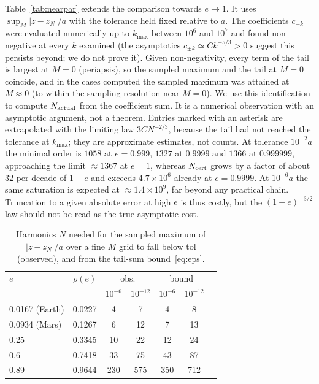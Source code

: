 Table~\ref{tab:nearpar} extends the comparison towards $e\to1$. It uses
$\sup_M|z-z_N|/a$ with the tolerance held fixed relative to $a$. The
coefficients $c_{\pm k}$ were evaluated numerically up to $k_{\max}$ between $10^{6}$ and
$10^{7}$ and found non-negative at every $k$ examined (the asymptotics $c_{\pm k}\simeq Ck^{-5/3}>0$
suggest this persists beyond; we do not prove it). Given non-negativity, every
term of the tail is largest at $M=0$ (periapsis), so the sampled maximum and the
tail at $M=0$ coincide, and in the cases computed the sampled maximum was
attained at $M\approx0$ (to within the sampling resolution near $M=0$). We use
this identification to compute $N_{\rm actual}$ from the coefficient sum. It is a
numerical observation with an asymptotic argument, not a theorem.
Entries marked with an asterisk are extrapolated with the limiting law
$3CN^{-2/3}$, because the tail had not reached the tolerance at $k_{\max}$; they
are approximate estimates, not counts. At tolerance
$10^{-2}a$ the minimal order is $1058$ at $e=0.999$, $1327$ at $0.9999$ and $1366$
at $0.999999$, approaching the limit $\approx1367$ at $e=1$, whereas
$N_{\rm cert}$ grows by a factor of about $32$ per decade of $1-e$ and exceeds
$4.7\times10^{6}$ already at $e=0.9999$. At $10^{-6}a$ the same saturation is
expected at $\approx1.4\times10^{9}$, far beyond any practical chain.
Truncation to a given absolute error at high $e$ is thus costly, but the
$(1-e)^{-3/2}$ law should not be read as the true asymptotic cost.

\begin{table}[tb]
\caption{Harmonics $N$ needed for the sampled maximum of $|z-z_N|/a$ over a
fine $M$ grid to fall below tol (observed), and from the tail-sum
bound~\eqref{eq:eps}.}
\label{tab:nneeded}
\begin{ruledtabular}
\begin{tabular}{lcccccc}
$e$ & $\rho(e)$ & \multicolumn{2}{c}{obs.} & \multicolumn{2}{c}{bound} \\
 & & $10^{-6}$ & $10^{-12}$ & $10^{-6}$ & $10^{-12}$ \\
\hline
0.0167 (Earth) & 0.0227 & 4 & 7 & 4 & 8 \\
0.0934 (Mars) & 0.1267 & 6 & 12 & 7 & 13 \\
0.25 & 0.3345 & 10 & 22 & 12 & 24 \\
0.6 & 0.7418 & 33 & 75 & 43 & 87 \\
0.89 & 0.9644 & 230 & 575 & 350 & 712 \\
\end{tabular}
\end{ruledtabular}
\end{table}

